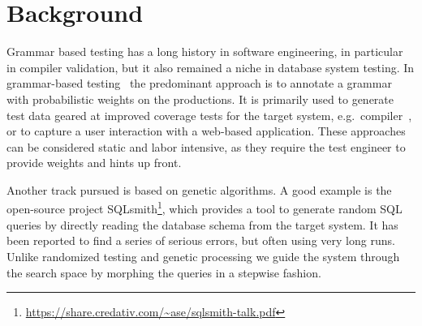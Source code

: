 \documentclass{cidr-2019}
\begin{document}
\section{Background}\label{background}


Grammar based testing has a long history in software engineering, in
particular in compiler validation, but it also remained a niche in
database system testing. In grammar-based
testing~\cite{10.1007/11754008_2,ZAMLI20111741} the predominant
approach is to annotate a grammar with probabilistic weights on the
productions. It is primarily used to generate test data geared at
improved coverage tests for the target system,
e.g.\ compiler~\cite{10.1007/978-3-642-41707-8_2}, or to capture a user
interaction with a web-based application. These approaches can be
considered static and labor intensive, as they require the test
engineer to provide weights and hints up front.

Another track pursued is based on genetic algorithms. A good example
is the open-source project
SQLsmith\footnote{\url{https://share.credativ.com/~ase/sqlsmith-talk.pdf}},
which provides a tool to generate random SQL queries by directly
reading the database schema from the target system. It has been
reported to find a series of serious errors, but often using very long
runs. Unlike randomized testing and genetic processing we guide the
system through the search space by morphing the queries in a stepwise
fashion.
\end{document}

